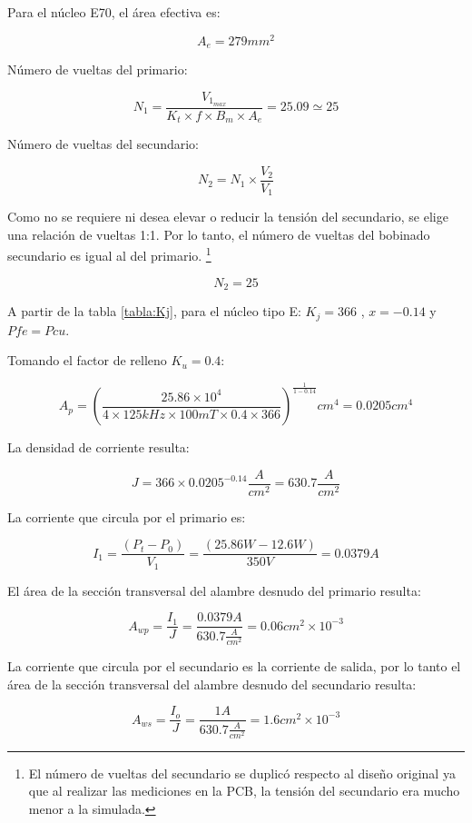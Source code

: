 Para el núcleo E70, el área efectiva es: 

$$ A_{e}=279{mm}^{2} $$

Número de vueltas del primario:

$$ N_{1}=\frac{V_{1_{max}}}{K_{t}\times f\times B_{m}\times A_{e}}=25.09\simeq 25 $$

Número de vueltas del secundario: 

$$ N_{2}=N_{1}\times\frac{V_{2}}{V_{1}} $$

Como no se requiere ni desea elevar o reducir la tensión del secundario, se elige una relación de vueltas 1:1. 
Por lo tanto, el número de vueltas del bobinado secundario es igual al del primario. \footnote{El número de vueltas del secundario se duplicó respecto al diseño original ya que al realizar las mediciones en la PCB, la tensión del secundario era mucho menor a la simulada.}

$$ N_{2}=25 $$

A partir de la tabla \ref{tabla:Kj}, para el núcleo tipo E: $ K_{j}=366$ , $x=-0.14$ y $Pfe=Pcu$. 

Tomando el factor de relleno $K_u=0.4$:

$$ A_{p}=\left(\frac{25.86\times 10^{4}}{4\times 125kHz\times 100mT\times 0.4\times 366}\right)^{\frac{1}{1-0.14}} {cm}^4=0.0205 {cm}^4$$

La densidad de corriente resulta:

$$ J=366\times 0.0205^{-0.14} \frac{A}{cm^2}=630.7 \frac{A}{cm^2} $$

La corriente que circula por el primario es:

$$ I_1=\frac{(P_t-P_0)}{V_1}=\frac{(25.86W-12.6W)}{350V}=0.0379A $$

El área de la sección transversal del alambre desnudo del primario resulta:

$$ A_{wp}=\frac{I_1}{J}=\frac{0.0379A}{630.7 \frac{A}{cm^2}}=0.06cm^2 \times10^{-3} $$

La corriente que circula por el secundario es la corriente de salida, 
por lo tanto el área de la sección transversal del alambre desnudo del secundario resulta:

$$ A_{ws}=\frac{I_o}{J}=\frac{1A}{630.7 \frac{A}{cm^2}}=1.6cm^2\times10^{-3} $$

